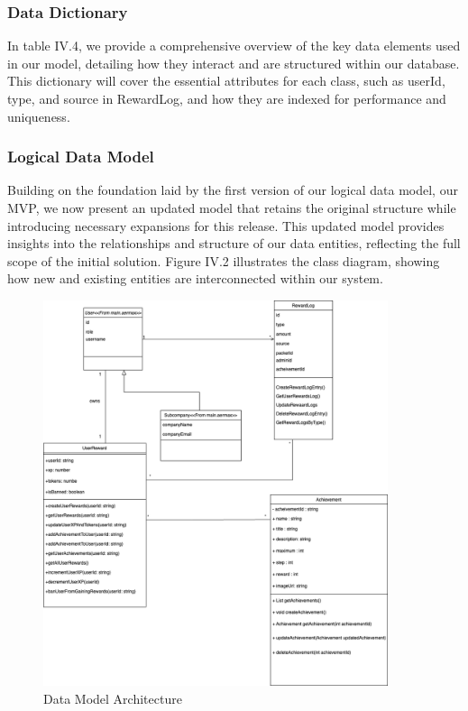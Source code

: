 \subsubsection{Data Dictionary}
In table IV.4, we provide a comprehensive overview of the key data elements used in our model, detailing how they interact and are structured within our database. This dictionary will cover the essential attributes for each class, such as userId, type, and source in RewardLog, and how they are indexed for performance and uniqueness.

\subsubsection{Logical Data Model}
Building on the foundation laid by the first version of our logical data model, our MVP, we now present an updated model that retains the original structure while introducing necessary expansions for this release. This updated model provides insights into the relationships and structure of our data entities, reflecting the full scope of the initial solution. Figure IV.2 illustrates the class diagram, showing how new and existing entities are interconnected within our system.


 \begin{figure}[H]
    \centering
    \includegraphics[width=0.9\textwidth]{src/assets/chapters/reward--system-classDiagram.drawio.png}
    \caption{ Data Model Architecture}
    \label{fig:reward_system_architecture_overview}
\end{figure}

